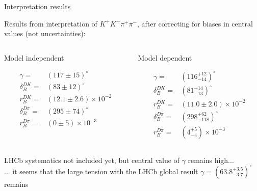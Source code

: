 \documentclass{beamer}
\begin{document}
\begin{frame}{Interpretation results}
  \begin{center}
    {\large Results from interpretation of $K^+K^-\pi^+\pi^-$, after correcting for biases in central values (not uncertainties):}
  \end{center}
  \vspace{-0.5cm}
  \begin{columns}
    \begin{column}{0.5\textwidth}
      \begin{center}
        Model independent
      \end{center}
      \begin{align*}
        \gamma =& (117 \pm 15)^\circ \\
        \delta_B^{DK} =& (83 \pm 12)^\circ \\
        r_B^{DK} =& (12.1 \pm 2.6)\times10^{-2} \\
        \delta_B^{D\pi} =& (295 \pm 74)^\circ \\
        r_B^{D\pi} =& (0 \pm 5)\times10^{-3}
      \end{align*}
    \end{column}
    \begin{column}{0.5\textwidth}
      \begin{center}
        Model dependent
      \end{center}
      \begin{align*}
        \gamma =& (116^{+12}_{-14})^\circ \\
        \delta_B^{DK} =& (81^{+14}_{-13})^\circ \\
        r_B^{DK} =& (11.0 \pm 2.0)\times10^{-2} \\
        \delta_B^{D\pi} =& (298^{+62}_{-118})^\circ \\
        r_B^{D\pi} =& (4^{+5}_{-4})\times10^{-3}
      \end{align*}
    \end{column}
  \end{columns}
  \vspace{0.2cm}
  \begin{center}
    LHCb systematics not included yet, but central value of $\gamma$ remains high...\\
    ... it seems that the large tension with the LHCb global result $\gamma = (63.8^{+3.5}_{-3.7})^\circ$ remains
  \end{center}
\end{frame}
\end{document}
